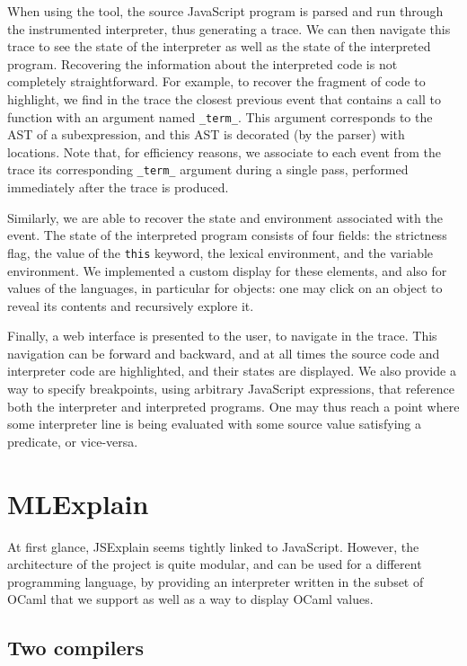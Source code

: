 \documentclass[twocolumn]{article}
\begin{document}
When using the tool, the source JavaScript program is parsed and run through the
instrumented interpreter, thus generating a trace. We can then navigate this
trace to see the state of the interpreter as well as the state of the
interpreted program. Recovering the information about the interpreted code is
not completely straightforward. For example, to recover the fragment of code to
highlight, we find in the trace the closest previous event that contains a call
to function with an argument named \texttt{\_term\_}. This argument corresponds
to the AST of a subexpression, and this AST is decorated (by the parser) with
locations. Note that, for efficiency reasons, we associate to each event from
the trace its corresponding \texttt{\_term\_} argument during a single pass,
performed immediately after the trace is produced.

Similarly, we are able to recover the state and environment associated with the
event. The state of the interpreted program consists of four fields: the
strictness flag, the value of the \texttt{this} keyword, the lexical
environment, and the variable environment. We implemented a custom display for
these elements, and also for values of the languages, in particular for objects:
one may click on an object to reveal its contents and recursively explore it.

Finally, a web interface is presented to the user, to navigate in the trace.
This navigation can be forward and backward, and at all times the source code
and interpreter code are highlighted, and their states are displayed. We also
provide a way to specify breakpoints, using arbitrary JavaScript expressions,
that reference both the interpreter and interpreted programs. One may thus reach
a point where some interpreter line is being evaluated with some source value
satisfying a predicate, or vice-versa.

\section{MLExplain}

At first glance, JSExplain seems tightly linked to JavaScript. However, the
architecture of the project is quite modular, and can be used for a different
programming language, by providing an interpreter written in the subset of OCaml
that we support as well as a way to display OCaml values.

\subsection{Two compilers}
\end{document}
